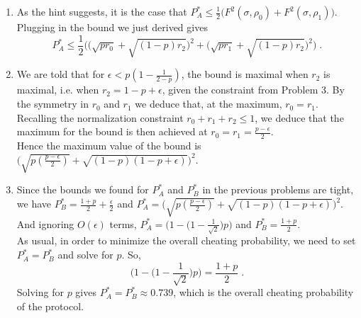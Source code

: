 \begin{exercises}
\begin{enumerate}
\item As the hint suggests, it is the case that $P_A^* \leq \frac{1}{2} \big( F^2(\sigma, \rho_0) + F^2(\sigma, \rho_1) \big)$. Plugging in the bound we just derived gives
\begin{equation*}
P_A^* \leq \frac12 \Big( \big(\sqrt{p r_0}+\sqrt{(1-p)r_2}\big)^2 + \big(\sqrt{p r_1}+\sqrt{(1-p)r_2}\big)^2 \Big)\;.
\end{equation*}

\item We are told that for $\epsilon < p(1-\frac{1}{2-p})$, the bound is maximal when $r_2$ is maximal, i.e. when $r_2 = 1-p+\epsilon$, given the constraint from Problem 3. By the symmetry in $r_0$ and $r_1$ we deduce that, at the maximum, $r_0 = r_1$.\\
Recalling the normalization constraint $r_0 + r_1 +r_2 \leq 1$, we deduce that the maximum for the bound is then achieved at $r_0 = r_1 =\frac{p-\epsilon}{2}$.\\
Hence the maximum value of the bound is $\Big(\sqrt{p (\frac{p-\epsilon}{2})} + \sqrt{(1-p)(1-p+\epsilon)}\Big)^2$.

\item Since the bounds we found for $P_A^*$ and $P_B^*$ in the previous problems are tight, we have
$P_B^* = \frac{1+p}{2} + \frac{\epsilon}{2}$ and $P_A^* = \Big(\sqrt{p (\frac{p-\epsilon}{2})} + \sqrt{(1-p)(1-p+\epsilon)}\Big)^2 $. And ignoring $O(\epsilon)$ terms, $P_A^* = \Big(1-\big(1-\frac{1}{\sqrt{2}} \big)p \Big)$ and $P_B^* = \frac{1+p}{2}$. \\
As usual, in order to minimize the overall cheating probability, we need to set $P_A^* = P_B^*$ and solve for $p$. So,
\begin{equation*}
\Big(1-\big(1-\frac{1}{\sqrt{2}} \big)p \Big) = \frac{1+p}{2}\;.
\end{equation*}
Solving for $p$ gives $P_A^* = P_B^* \approx 0.739$, which is the overall cheating probability of the protocol.
\end{enumerate}
\end{exercises}